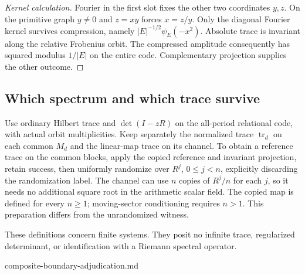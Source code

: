 \begin{proof}[Kernel calculation]
Fourier in the first slot fixes the other two coordinates $y,z$. On the
primitive graph $y\ne0$ and $z=xy$ forces $x=z/y$. Only the diagonal
Fourier kernel survives compression, namely $|E|^{-1/2}\psi_E(-x^2)$.
Absolute trace is invariant along the relative Frobenius orbit. The
compressed amplitude consequently has squared modulus $1/|E|$ on the
entire code. Complementary projection supplies the other outcome.
\end{proof}

\subsection{Which spectrum and which trace survive}

\begin{definition}
Use ordinary Hilbert trace and $\det(I-zR)$ on the all-period relational
code, with actual orbit multiplicities. Keep separately the normalized
trace $\operatorname{tr}_d$ on each common $M_d$ and the linear-map trace
on its channel. To obtain a reference trace on the common blocks, apply
the copied reference and invariant projection, retain success, then
uniformly randomize over $R^j$, $0\leq j<n$, explicitly discarding the
randomization label. The channel can use $n$ copies of $R^j/n$ for each
$j$, so it needs no additional square root in the arithmetic scalar field.
The copied map is defined for every $n\geq1$; moving-sector conditioning
requires $n>1$. This preparation differs from the unrandomized witness.
\end{definition}
\begin{scope}
These definitions concern finite systems. They posit no infinite trace,
regularized determinant, or identification with a Riemann spectral operator.
\end{scope}
{composite-boundary-adjudication.md}

